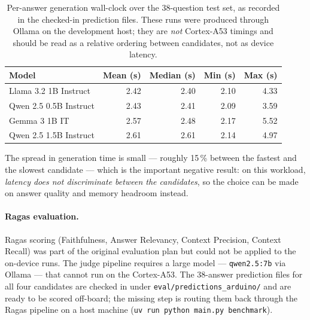 \documentclass[11pt,a4paper]{article}
\begin{document}
\begin{table}[h]
\centering
\caption{Per-answer generation wall-clock over the 38-question test set, as
recorded in the checked-in prediction files. These runs were produced through
Ollama on the development host; they are \emph{not} Cortex-A53 timings and
should be read as a relative ordering between candidates, not as device
latency.}
\begin{tabular}{lrrrr}
\toprule
\textbf{Model} & \textbf{Mean (s)} & \textbf{Median (s)} & \textbf{Min (s)} & \textbf{Max (s)} \\
\midrule
Llama 3.2 1B Instruct  & 2.42 & 2.40 & 2.10 & 4.33 \\
Qwen 2.5 0.5B Instruct & 2.43 & 2.41 & 2.09 & 3.59 \\
Gemma 3 1B IT          & 2.57 & 2.48 & 2.17 & 5.52 \\
Qwen 2.5 1.5B Instruct & 2.61 & 2.61 & 2.14 & 4.97 \\
\bottomrule
\end{tabular}
\end{table}

The spread in generation time is small --- roughly 15\,\% between the fastest
and the slowest candidate --- which is the important negative result: on this
workload, \emph{latency does not discriminate between the candidates}, so the
choice can be made on answer quality and memory headroom instead.

\paragraph{Ragas evaluation.}
Ragas scoring (Faithfulness, Answer Relevancy, Context Precision, Context
Recall) was part of the original evaluation plan but could not be applied to
the on-device runs. The judge pipeline requires a large model ---
\texttt{qwen2.5:7b} via Ollama --- that cannot run on the Cortex-A53.
The 38-answer prediction files for all four candidates are checked in under
\texttt{eval/predictions\_arduino/} and are ready to be scored off-board;
the missing step is routing them back through the Ragas pipeline on a host
machine (\texttt{uv run python main.py benchmark}).
\label{tab:slm-ragas}
\end{document}
